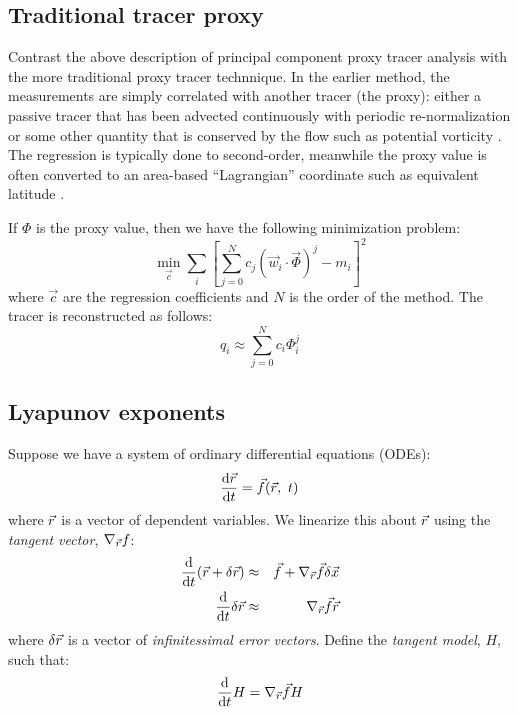 \documentclass{article}
\begin{document}
\subsection{Traditional tracer proxy}

\label{traditional}

Contrast the above description of principal component proxy tracer
analysis with the more traditional proxy tracer technnique.
In the earlier method, the measurements are simply correlated with another
tracer (the proxy): either a passive tracer that has been advected
continuously with periodic re-normalization \citep{Allen_Nakamura2003} 
or some other quantity that is conserved by the flow 
such as potential vorticity \citep{Randall_etal2002,Hoskins_etal1985}.
The regression is typically done to second-order, meanwhile the proxy value
is often converted to an area-based ``Lagrangian'' coordinate such as
equivalent latitude \citep{Butchart_Remsberg1986}.

If $\Phi$ is the proxy value, then we have the following minimization
problem:
\begin{equation}
	\min_{\vec c} \sum_i \left [ \sum_{j=0}^N c_j (\vec w_i \cdot \vec \Phi)^j - m_i \right ]^2
\end{equation}
where $\vec c$ are the regression coefficients and $N$ is the order of the
method. The tracer is reconstructed as follows:
\begin{equation}
	q_i \approx \sum_{j=0}^N c_i \Phi_i^j
\end{equation}

\subsection{Lyapunov exponents}

Suppose we have a system of ordinary differential equations (ODEs):
\begin{equation}
	\frac{\mathrm d \vec r}{\mathrm d t} = \vec f(\vec r, ~ t)
	\label{ODE}
\end{equation}
where $\vec r$ is a vector of dependent variables.
We linearize this about $\vec r$ using the {\it tangent vector},
$\nabla_{\vec r} f$:
\begin{eqnarray}
\frac{\mathrm d}{\mathrm d t} (\vec r + \delta \vec r) & \approx & \vec f + 
	\nabla_{\vec r} \vec f \delta \vec x \\
	\frac{\mathrm d}{\mathrm d t} \delta \vec r & \approx & \nabla_{\vec r} \vec f \vec r
\end{eqnarray}
where $\delta \vec r$ is a vector of {\it infinitessimal error vectors}.
Define the {\it tangent model}, $H$, such that:
\begin{equation} 
	\frac{\mathrm d}{\mathrm d t} H = \nabla_{\vec r} \vec f H \\
\end{equation}
\end{document}
